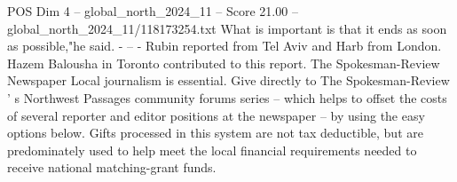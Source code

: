 \begin{textsample}{POS Dim 4 – global\_north\_2024\_11 – Score 21.00 – global\_north\_2024\_11/118173254.txt}
What is important is that it ends as soon as possible,"he said. - -- - Rubin reported from Tel Aviv and Harb from London.
Hazem Balousha in Toronto contributed to this report.
The Spokesman-Review Newspaper Local journalism is essential.
Give directly to The Spokesman-Review ' s Northwest Passages community forums series -- which helps to offset the costs of several reporter and editor positions at the newspaper -- by using the easy options below.
Gifts processed in this system are not tax deductible, but are predominately used to help meet the local financial requirements needed to receive national matching-grant funds.

\end{textsample}
